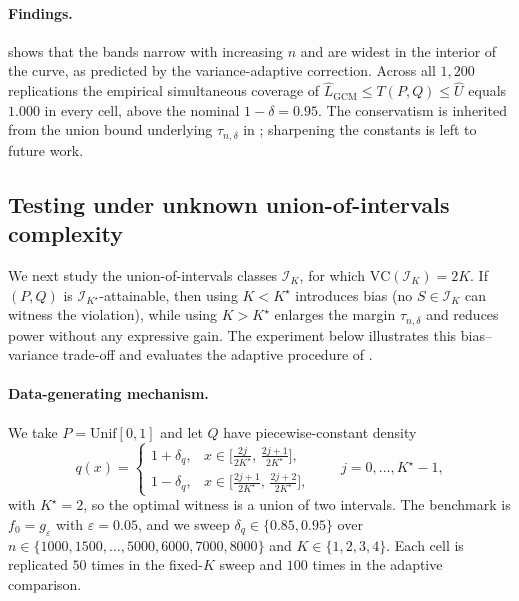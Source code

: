 \documentclass[english]{article}
\theoremstyle{plain}
\theoremstyle{definition}
\newcommand{\fnull}{f_0}
\begin{document}
\paragraph{Findings.}
 shows that the bands narrow with
increasing $n$ and are widest in the interior of the curve, as predicted by
the variance-adaptive correction. Across all $1{,}200$ replications the empirical
simultaneous coverage of
$\hat L_{\mathrm{GCM}}\leqslant T(P,Q)\leqslant\hat U$ equals $1.000$ in
every cell, above the nominal $1-\delta=0.95$. The conservatism is
inherited from the union bound underlying $\tau_{n,\delta}$ in
; sharpening the constants is left to future work.









\subsection{Testing under unknown union-of-intervals complexity}\label{sec:exp-iu}

We next study the union-of-intervals classes $\mathcal I_K$, for which
$\mathrm{VC}(\mathcal I_K)=2K$. If $(P,Q)$ is
$\mathcal I_{K^\star}$-attainable, then using $K<K^\star$ introduces bias
(no $S\in\mathcal I_K$ can witness the violation), while using $K>K^\star$
enlarges the margin $\tau_{n,\delta}$ and reduces power without any
expressive gain. The experiment below illustrates this bias--variance
trade-off and evaluates the adaptive procedure of
.

\paragraph{Data-generating mechanism.}
We take $P=\mathrm{Unif}[0,1]$ and let $Q$ have piecewise-constant density
\[
q(x)=
\begin{cases}
1+\delta_q,& x\in\bigl[\tfrac{2j}{2K^\star},\,\tfrac{2j+1}{2K^\star}\bigr],\\
1-\delta_q,& x\in\bigl[\tfrac{2j+1}{2K^\star},\,\tfrac{2j+2}{2K^\star}\bigr],
\end{cases}
\qquad j=0,\ldots,K^\star-1,
\]
with $K^\star=2$, so the optimal witness is a union of two intervals. The
benchmark is $\fnull=g_\varepsilon$ with $\varepsilon=0.05$, and we sweep
$\delta_q\in\{0.85,0.95\}$ over
$n\in\{1000,1500,\ldots,5000,6000,7000,8000\}$ and $K\in\{1,2,3,4\}$. Each
cell is replicated $50$ times in the fixed-$K$ sweep and $100$ times in the
adaptive comparison.
\end{document}
